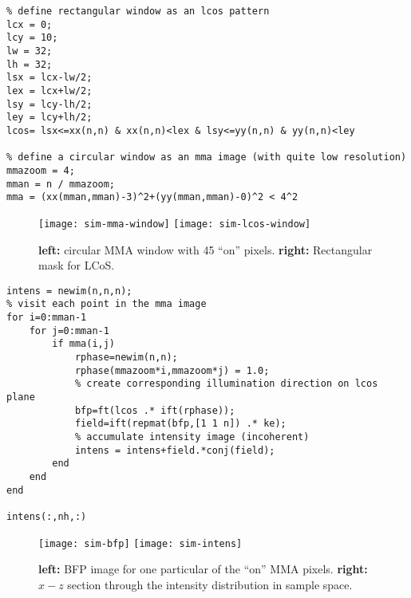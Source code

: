 {\begin{verbatim}
% define rectangular window as an lcos pattern
lcx = 0;
lcy = 10;
lw = 32;
lh = 32;
lsx = lcx-lw/2;
lex = lcx+lw/2;
lsy = lcy-lh/2;
ley = lcy+lh/2;
lcos= lsx<=xx(n,n) & xx(n,n)<lex & lsy<=yy(n,n) & yy(n,n)<ley

% define a circular window as an mma image (with quite low resolution)
mmazoom = 4;
mman = n / mmazoom;
mma = (xx(mman,mman)-3)^2+(yy(mman,mman)-0)^2 < 4^2
\end{verbatim}

\begin{figure}[!hbt]
  \centering
  \texttt{[image: sim-mma-window]}
  \quad\quad
  \texttt{[image: sim-lcos-window]}
  \caption{{\bf left:} circular MMA window with 45 ``on'' pixels. {\bf
      right:} Rectangular mask for LCoS.}
  \label{fig:mma-lcos-window}
\end{figure}


\begin{verbatim}
intens = newim(n,n,n);
% visit each point in the mma image
for i=0:mman-1
    for j=0:mman-1
        if mma(i,j)
            rphase=newim(n,n);
            rphase(mmazoom*i,mmazoom*j) = 1.0;
            % create corresponding illumination direction on lcos plane
            bfp=ft(lcos .* ift(rphase));
            field=ift(repmat(bfp,[1 1 n]) .* ke);
            % accumulate intensity image (incoherent)
            intens = intens+field.*conj(field);
        end
    end
end

intens(:,nh,:)
\end{verbatim}}
\begin{figure}[!hbt]
  \centering
  \texttt{[image: sim-bfp]}
  \quad\quad
  \texttt{[image: sim-intens]}
  \caption{{\bf left:} BFP image for one particular of the ``on'' MMA
    pixels. {\bf right:} $x-z$ section through the intensity
    distribution in sample space.}
  \label{fig:sim-bfp-intens}
\end{figure}
